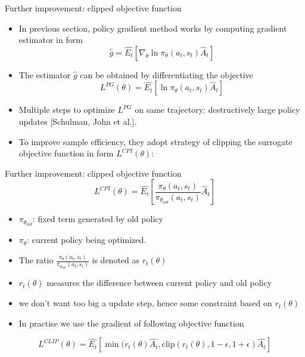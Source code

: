 \begin{frame}{Further improvement: clipped objective function}
    \begin{itemize}
        \item In previous section, policy gradient method works by computing gradient estimator in form
            \begin{equation}
                \label{commonPG}
                \hat{g} = \hat{E_t}[\nabla_{\theta}\ln\pi_\theta(a_t,s_t)\hat{A}_{t}]
            \end{equation}
        \item The estimator $\hat{g}$ can be obtained by differentiating the objective
            \begin{equation}
                \label{objPG}
                L^{PG}(\theta) = \hat{E_t}[\ln\pi_\theta(a_t,s_t)\hat{A}_{t}]
            \end{equation}
        \item Multiple steps to optimize $L^{PG}$ on same trajectory: destructively large policy updates \textcolor{CUHKgreen}{\footnotesize[Schulman, John et al.]}. 
        \item To improve sample efficiency, they adopt strategy of clipping the surrogate objective function in form $L^{CPI}(\theta)$:

    \end{itemize} 
\end{frame}

\begin{frame}{Further improvement: clipped objective function}
\begin{equation}
                \label{objPPO}
                L^{CPI}(\theta) = \hat{E_t}[\frac{\pi_\theta(a_t,s_t)}{\pi_{\theta_{old}}(a_t,s_t)}\hat{A}_{t}]
            \end{equation}
\begin{itemize}
    \item $\pi_{\theta_{old}}$: fixed term generated by old policy\vspace{0.2cm}
    \item $\pi_{\theta}$: current policy being optimized. \vspace{0.2cm}
    \item The ratio $\frac{\pi_\theta(a_t,s_t)}{\pi_{\theta_{old}}(a_t,s_t)}$ is denoted as $r_t(\theta)$\vspace{0.2cm}
    \item $r_t(\theta)$ measures the difference between current policy and old policy\vspace{0.2cm}
    \item we don't want too big a update step, hence some constraint based on $r_t(\theta)$\vspace{0.2cm}
    \item In practise we use the gradient of following objective function\vspace{0.2cm}
\end{itemize}
\begin{equation}
    \label{clipPPO}
    L^{CLIP}(\theta) = \hat{E_t}[\min(r_t(\theta)\hat{A_t},\mathrm{clip}(r_t(\theta),1-\epsilon,1+\epsilon)\hat{A_t}]
\end{equation}
\end{frame}

